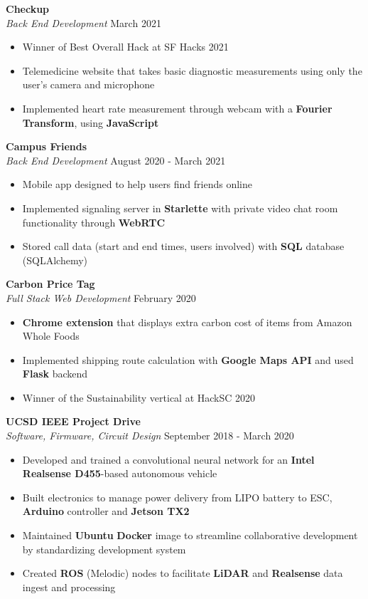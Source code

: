 \documentclass[a4paper]{article}
\newenvironment{entry}[4][]{
  \textbf{#2} \hfill #1 \\
  \textit{#3} \hfill #4 \\
  \vspace{-2mm}
  \begin{itemize} \itemsep 0em
  }
  {
  \end{itemize}
}
\begin{document}
\begin{entry}{Checkup}{Back End Development}{March 2021}
\item Winner of Best Overall Hack at SF Hacks 2021
\item Telemedicine website that takes basic diagnostic measurements using only the user’s camera and microphone
\item Implemented heart rate measurement through webcam with a \textbf{Fourier Transform}, using \textbf{JavaScript}
\end{entry}

\begin{entry}{Campus Friends}{Back End Development}{August 2020 - March 2021}
 \item Mobile app designed to help users find friends online
\item Implemented signaling server in \textbf{Starlette} with private video chat room functionality through \textbf{WebRTC}
\item Stored call data (start and end times, users involved) with \textbf{SQL} database (SQLAlchemy)
\end{entry}

\begin{entry}{Carbon Price Tag}{Full Stack Web Development}{February 2020}
\item \textbf{Chrome extension} that displays extra carbon cost of items from Amazon Whole Foods
\item Implemented shipping route calculation with \textbf{Google Maps API} and used
  \textbf{Flask} backend
\item Winner of the Sustainability vertical at HackSC 2020
\end{entry}

\begin{entry}{UCSD IEEE Project Drive}{Software, Firmware, Circuit Design}{September 2018 - March 2020}
\item Developed and trained a convolutional neural network for an \textbf{Intel Realsense D455}-based autonomous vehicle
\item Built electronics to manage power delivery from LIPO battery to ESC, \textbf{Arduino} controller and \textbf{Jetson TX2}
\item Maintained \textbf{Ubuntu} \textbf{Docker} image to streamline collaborative development by standardizing development system
\item Created \textbf{ROS} (Melodic) nodes to facilitate \textbf{LiDAR} and \textbf{Realsense} data ingest and processing
\end{entry}
\end{document}
